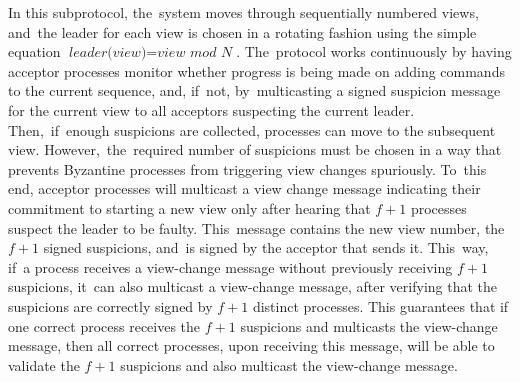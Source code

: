 \documentclass[algorithms,article,accept,moreauthors,pdftex,10pt,a4paper]{Definitions/mdpi}
\begin{document}
In this subprotocol, the~system moves through sequentially numbered views, and~the leader for each view is chosen in a rotating fashion using the simple equation $\textit{leader(view)}=\textit{view mod N}$. The~protocol works continuously by having acceptor processes monitor whether progress is being made on adding commands to the current sequence, and, if~not, by~multicasting a {signed} {\sc suspicion} %
message for the current view to all acceptors suspecting the current leader. Then,~if~enough suspicions are collected, processes can move to the subsequent view. However,~the~required number of suspicions must be chosen in a way that prevents Byzantine processes from triggering view changes spuriously. To~this end, acceptor processes will multicast a view change message indicating their commitment to starting a new view only after hearing that $f+1$ processes suspect the leader to be faulty. This~message contains the new view number, the~$f+1$ signed suspicions, and~is signed by the acceptor that sends it. This~way, if~a process receives a view-change message without previously receiving $f+1$ suspicions, it~can also multicast a view-change message, after verifying that the suspicions are correctly signed by $f+1$ distinct processes.
This guarantees that if one correct process receives the $f+1$ suspicions and multicasts the view-change message, then all correct processes, upon receiving this message, will be able to validate the $f+1$ suspicions and also multicast the view-change message.\par
\end{document}
